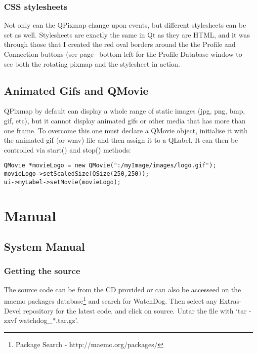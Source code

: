 \subsubsection{CSS stylesheets}
Not only can the QPixmap change upon events, but different stylesheets can be set as well. Stylesheets are exactly the same in Qt as they are HTML, and it was through those that I created the red oval borders around the the Profile and Connection buttons (see page~\pageref{guimap} bottom left for the Profile Database window to see both the rotating pixmap and the stylesheet in action.

\subsection{Animated Gifs and QMovie}
QPixmap by default can display a whole range of static images (jpg, png, bmp, gif, etc), but it cannot display animated gifs or other media that has more than one frame. To overcome this one must declare a QMovie object, initialise it with the animated gif (or wmv) file and then assign it to a QLabel. It can then be controlled via start() and stop() methods:
\begin{lstlisting}
QMovie *movieLogo = new QMovie(":/myImage/images/logo.gif");
movieLogo->setScaledSize(QSize(250,250));
ui->myLabel->setMovie(movieLogo);
\end{lstlisting}

\section{Manual}
\subsection{System Manual}
\subsubsection{Getting the source}
The source code can be from the CD provided or can also be accesseed on the maemo packages database\footnote{Package Search - http://maemo.org/packages/}\label{ref:packsearch} and search for WatchDog. Then select any Extras-Devel repository for the latest code, and click on source. Untar the file with ‘tar -zxvf  watchdog\_*.tar.gz’.
